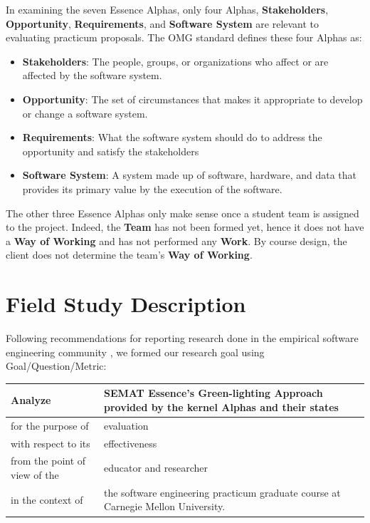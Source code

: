 \documentclass[conference]{IEEEtran}
\begin{document}
In examining the seven Essence Alphas, only four Alphas,
\textbf{Stakeholders}, \textbf{Opportunity}, \textbf{Requirements}, and \textbf{Software System} are relevant to evaluating practicum proposals. The OMG standard defines these four Alphas as: \cite{OMGStandard}

\begin{itemize}
\itemsep1pt\parskip0pt
\item
  \textbf{Stakeholders}: The people, groups, or organizations who affect or
  are affected by the software system.
\item
  \textbf{Opportunity}: The set of circumstances that makes it appropriate to
  develop or change a software system.
\item
  \textbf{Requirements}: What the software system should do to address the
  opportunity and satisfy the stakeholders
\item
  \textbf{Software System}: A system made up of software, hardware, and data
  that provides its primary value by the execution of the software.
\end{itemize}

The other three Essence Alphas only make sense once a student team is
assigned to the project. Indeed, the \textbf{Team} has not been formed yet,
hence it does not have a \textbf{Way of Working} and has not performed any
\textbf{Work}. By course design, the client does not determine the team's
\textbf{Way of Working}.


\section{Field Study Description}
\label{Field Study Description}

Following recommendations for reporting research done in the empirical
software engineering community
\cite{GQM, Shaw}, we formed our
research goal using Goal/Question/Metric:
\cite{GQM}

\begin{table}[h]
\centering
\begin{tabular}{|p{1.00in}|p{2.10in}|}
\hline
Analyze & SEMAT Essence’s Green-lighting Approach provided by the kernel Alphas and their states \\ \hline
for the purpose of & evaluation \\ \hline
with respect to its & effectiveness \\ \hline
from the point of view of the & educator and researcher \\ \hline
in the context of  & the software engineering practicum graduate course at Carnegie Mellon University. \\
\hline
\end{tabular}
\end{table}
\end{document}
